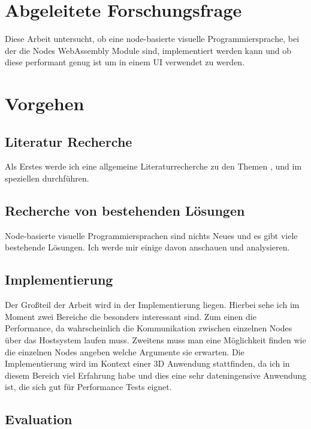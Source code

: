 \documentclass{article}
\begin{document}
\section{Abgeleitete Forschungsfrage}
Diese Arbeit untersucht, ob eine node-basierte visuelle Programmiersprache, bei der die Nodes WebAssembly Module sind, implementiert werden kann und ob diese performant genug ist um in einem UI verwendet zu werden.

\section{Vorgehen}
\subsection{Literatur Recherche}
Als Erstes werde ich eine allgemeine Literaturrecherche zu den Themen ,  und im speziellen  durchführen.

\subsection{Recherche von bestehenden Lösungen}
Node-basierte visuelle Programmiersprachen sind nichts Neues und es gibt viele bestehende Lösungen. Ich werde mir einige davon anschauen und analysieren.

\subsection{Implementierung}
Der Großteil der Arbeit wird in der Implementierung liegen. Hierbei sehe ich im Moment zwei Bereiche die besonders interessant sind. Zum einen die Performance, da wahrscheinlich die Kommunikation zwischen einzelnen Nodes über das Hostsystem laufen muss. Zweitens muss man eine Möglichkeit finden wie die einzelnen Nodes angeben welche Argumente sie erwarten. 
\linebreak
\linebreak
Die Implementierung wird im Kontext einer 3D Anwendung stattfinden, da ich in diesem Bereich viel Erfahrung habe und dies eine sehr dateningensive Anwendung ist, die sich gut für Performance Tests eignet.

\subsection{Evaluation}
\end{document}
